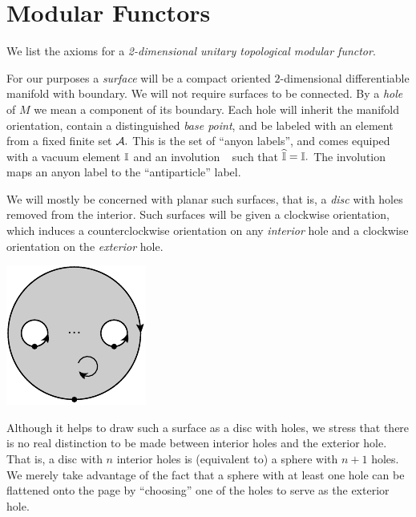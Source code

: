 \documentclass[aps, prl, letterpaper, twocolumn, superscriptaddress, notitlepage, 10pt]{revtex4-1}
\begin{document}
\section{Modular Functors}

We list the axioms for a 
\emph{2-dimensional unitary topological modular functor}.

For our purposes a \emph{surface} will be a compact
oriented $2$-dimensional differentiable manifold with boundary. %
We will not require surfaces to be connected.
By a \emph{hole} of $M$ we mean a component of its boundary. %
Each hole will inherit the manifold orientation,
contain a distinguished \emph{base point},
and be labeled with
an element from a fixed finite set $\mathcal{A}.$
This is the set of ``anyon labels'', and comes
equiped with a vacuum element $\mathbb{I}$ 
and an involution $\ \widehat{}\ $ such that $\widehat{\mathbb{I}}=\mathbb{I}.$
The involution maps an anyon label to the ``antiparticle'' label.

We will mostly be concerned with planar such
surfaces, that is, a \emph{disc} with holes removed from the
interior.
Such surfaces will be given a clockwise 
orientation, which induces a counterclockwise orientation on
any \emph{interior} hole and a clockwise orientation
on the \emph{exterior} hole.
\begin{center}
\includegraphics[]{pic-disc.pdf}
\end{center}
Although it helps to draw such a surface as a disc with holes,
we stress that there is no real distinction to be made between
interior holes and the exterior hole.
That is, 
a disc with $n$ interior holes is (equivalent to) a sphere with $n+1$ holes.
We merely take advantage of the fact that a sphere with at least one hole
can be flattened onto the page by ``choosing'' one of the holes to
serve as the exterior hole.
\end{document}
